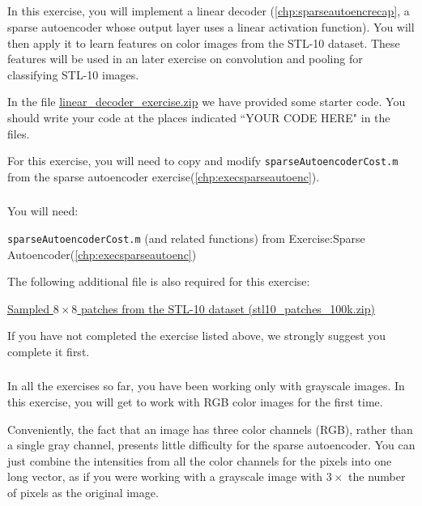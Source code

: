 \subsection{} \label{chp:execcolorfeaturesparseautoenc}

In this exercise, you will implement a linear decoder (\ref{chp:sparseautoencrecap}, a sparse autoencoder whose output layer uses a linear activation function). You will then apply it to learn features on color images from the STL-10 dataset. These features will be used in an later exercise on convolution and pooling for classifying STL-10 images.

In the file \href{http://ufldl.stanford.edu/wiki/resources/linear_decoder_exercise.zip}{linear\_decoder\_exercise.zip} we have provided some starter code. You should write your code at the places indicated ``YOUR CODE HERE" in the files.

For this exercise, you will need to copy and modify \texttt{sparseAutoencoderCost.m} from the sparse autoencoder exercise(\ref{chp:execsparseautoenc}).

\subsubsection{}

You will need:

    \texttt{sparseAutoencoderCost.m} (and related functions) from Exercise:Sparse Autoencoder(\ref{chp:execsparseautoenc})

The following additional file is also required for this exercise:

    \href{http://ufldl.stanford.edu/wiki/resources/stl10_patches_100k.zip}{Sampled $8 \times 8$ patches from the STL-10 dataset (stl10\_patches\_100k.zip)}

If you have not completed the exercise listed above, we strongly suggest you complete it first.


\subsubsection{}

In all the exercises so far, you have been working only with grayscale images. In this exercise, you will get to work with RGB color images for the first time.

Conveniently, the fact that an image has three color channels (RGB), rather than a single gray channel, presents little difficulty for the sparse autoencoder. You can just combine the intensities from all the color channels for the pixels into one long vector, as if you were working with a grayscale image with $3 \times$ the number of pixels as the original image.

